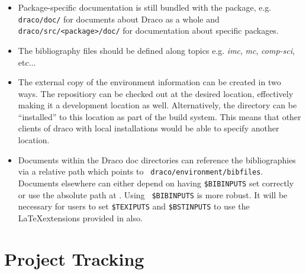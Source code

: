 \documentclass[note]{ResearchNote_pdf}
\begin{document}
\begin{itemize}
  
\item Package-specific documentation is still bundled with the
  package, e.g. {\tt draco/doc/} for documents about Draco as a
  whole and {\tt draco/src/<package>/doc/} for documentation about
  specific packages.
  
\item The bibliography files should be defined along topics e.g. {\em
    imc}, {\em mc}, {\em comp-sci}, etc...

\item The external copy of the environment information can be created
  in two ways. The repositiory can be checked out at the desired
  location, effectively making it a development location as well.
  Alternatively, the directory can be ``installed'' to this location
  as part of the build system. This means that other clients of draco
  with local installations would be able to specify another location.
  
\item Documents within the Draco doc directories can reference the
  bibliographies via a relative path which points to {\tt
    draco/environment/bibfiles}. Documents elsewhere can either depend
  on having {\tt \$BIBINPUTS} set correctly or use the absolute path
  at . Using {\tt
    \$BIBINPUTS} is more robust. It will be necessary for users to set
  {\tt \$TEXIPUTS} and {\tt \$BSTINPUTS} to use the \LaTeX extensions
  provided in  also.

\end{itemize}
  


\section*{Project Tracking}

%
%   
% 
% 
%
%   
\end{document}
